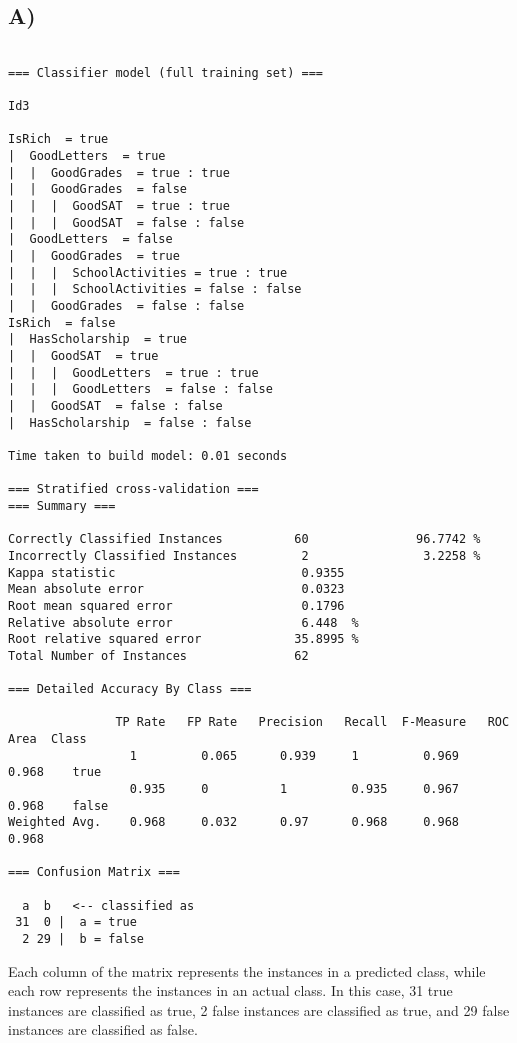 \documentclass[11pt]{article}
\begin{document}
\subsection*{A)}
\begin{lstlisting}

=== Classifier model (full training set) ===

Id3

IsRich  = true 
|  GoodLetters  = true 
|  |  GoodGrades  = true : true
|  |  GoodGrades  = false 
|  |  |  GoodSAT  = true : true
|  |  |  GoodSAT  = false : false
|  GoodLetters  = false 
|  |  GoodGrades  = true 
|  |  |  SchoolActivities = true : true
|  |  |  SchoolActivities = false : false
|  |  GoodGrades  = false : false
IsRich  = false 
|  HasScholarship  = true 
|  |  GoodSAT  = true 
|  |  |  GoodLetters  = true : true
|  |  |  GoodLetters  = false : false
|  |  GoodSAT  = false : false
|  HasScholarship  = false : false

Time taken to build model: 0.01 seconds

=== Stratified cross-validation ===
=== Summary ===

Correctly Classified Instances          60               96.7742 %
Incorrectly Classified Instances         2                3.2258 %
Kappa statistic                          0.9355
Mean absolute error                      0.0323
Root mean squared error                  0.1796
Relative absolute error                  6.448  %
Root relative squared error             35.8995 %
Total Number of Instances               62     

=== Detailed Accuracy By Class ===

               TP Rate   FP Rate   Precision   Recall  F-Measure   ROC Area  Class
                 1         0.065      0.939     1         0.969      0.968    true
                 0.935     0          1         0.935     0.967      0.968    false
Weighted Avg.    0.968     0.032      0.97      0.968     0.968      0.968

=== Confusion Matrix ===

  a  b   <-- classified as
 31  0 |  a = true
  2 29 |  b = false

\end{lstlisting}
Each column of the matrix represents the instances in a predicted class, while each row represents the instances in an actual class. In this case, 31 true instances are classified as true, 2 false instances are classified as true, and 29 false instances are classified as false.
\end{document}
